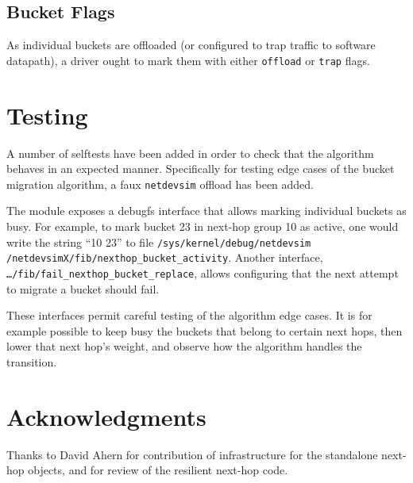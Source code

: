 \documentclass[letterpaper]{article}
\begin{document}
\subsection{Bucket Flags}

As individual buckets are offloaded (or configured to trap traffic to
software datapath), a driver ought to mark them with either
\texttt{offload} or \texttt{trap} flags.

\section{Testing}

A number of selftests have been added in order to check that the algorithm
behaves in an expected manner. Specifically for testing edge cases of the
bucket migration algorithm, a faux \texttt{netdevsim} offload has been
added.

The module exposes a debugfs interface that allows marking individual
buckets as busy. For example, to mark bucket 23 in next-hop group 10 as
active, one would write the string ``10 23'' to file
\texttt{/sys/kernel/debug/netdevsim\\/netdevsimX/fib/nexthop\_bucket\_activity}.
Another interface, \texttt{\ldots/fib/fail\_nexthop\_bucket\_replace},
allows configuring that the next attempt to migrate a bucket should fail.

These interfaces permit careful testing of the algorithm edge cases. It is
for example possible to keep busy the buckets that belong to certain next
hops, then lower that next hop's weight, and observe how the algorithm
handles the transition.

\section{Acknowledgments}
Thanks to David Ahern for contribution of infrastructure for the standalone
next-hop objects, and for review of the resilient next-hop code.



\end{document}
